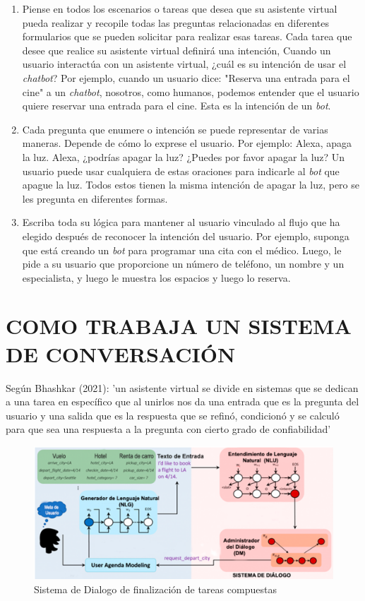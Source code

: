 \documentclass[letter, openright, 12pt]{book}
\newcommand*\setcaptioncitation[1]{\def\captioncitation{\textit{Fuente:}~#1}}
\let\captioncitation\relax
\begin{document}
\begin{enumerate}[label=(\alph*)]
\item Piense en todos los escenarios o tareas que desea que su asistente virtual pueda realizar y recopile todas las preguntas relacionadas en diferentes formularios que se pueden solicitar para realizar esas tareas. Cada tarea que desee que realice su asistente virtual definirá una intención, Cuando un usuario interactúa con un asistente virtual, ¿cuál es su intención de usar el \textit{chatbot}? Por ejemplo, cuando un usuario dice: "Reserva una entrada para el cine" a un \textit{chatbot}, nosotros, como humanos, podemos entender que el usuario quiere reservar una entrada para el cine. Esta es la intención de un \textit{bot}. 
\item Cada pregunta que enumere o intención se puede representar de varias maneras. Depende de cómo lo exprese el usuario. Por ejemplo: Alexa, apaga la luz. Alexa, ¿podrías apagar la luz? ¿Puedes por favor apagar la luz? Un usuario puede usar cualquiera de estas oraciones para indicarle al \textit{bot} que apague la luz. Todos estos tienen la misma intención de apagar la luz, pero se les pregunta en diferentes formas.  
\item Escriba toda su lógica para mantener al usuario vinculado al flujo que ha elegido después de reconocer la intención del usuario. Por ejemplo, suponga que está creando un \textit{bot} para programar una cita con el médico. Luego, le pide a su usuario que proporcione un número de teléfono, un nombre y un especialista, y luego le muestra los espacios y luego lo reserva.
\end{enumerate}


\section{COMO TRABAJA UN SISTEMA DE CONVERSACIÓN}

Según Bhashkar (2021): 'un asistente virtual se divide en sistemas que se dedican a una tarea en específico que al unirlos nos da una entrada que es la pregunta del usuario y una salida que es la respuesta que se refinó, condicionó y se calculó para que sea una respuesta a la pregunta con cierto grado de confiabilidad'

\begin{figure}[!ht]
\includegraphics[width=1\textwidth]{figura2_2}
\setcaptioncitation{(Microsoft, 2016)}
\caption{Sistema de Dialogo de finalización de tareas compuestas}
\label{tab:figura2_2} 
\end{figure}
\end{document}
